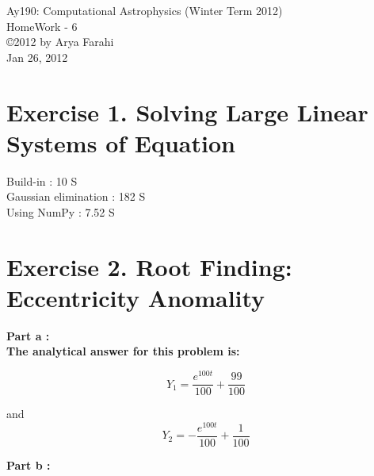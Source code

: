 \documentclass[10pt]{article}
\begin{document}
\begin{center}
{\large Ay190: Computational Astrophysics (Winter Term 2012)} \\
{\large HomeWork - 6 } \\
\copyright 2012 by Arya Farahi \\
Jan 26, 2012
\end{center}

\section{Exercise 1. Solving Large Linear Systems of Equation}

Build-in : 10 S \\
Gaussian elimination : 182 S \\
Using NumPy : 7.52 S

\pagebreak

\section{Exercise 2. Root Finding: Eccentricity Anomality}

\bfseries{Part a : } \\ \mdseries
The analytical answer for this problem is:

\begin{equation}
 Y_1 = \frac{e^{100t}}{100} + \frac{99}{100}
\end{equation}

and \\

\begin{equation}
 Y_2 = - \frac{e^{100t}}{100} + \frac{1}{100}
\end{equation}

\bfseries{Part b :}\\ \mdseries
\end{document}
